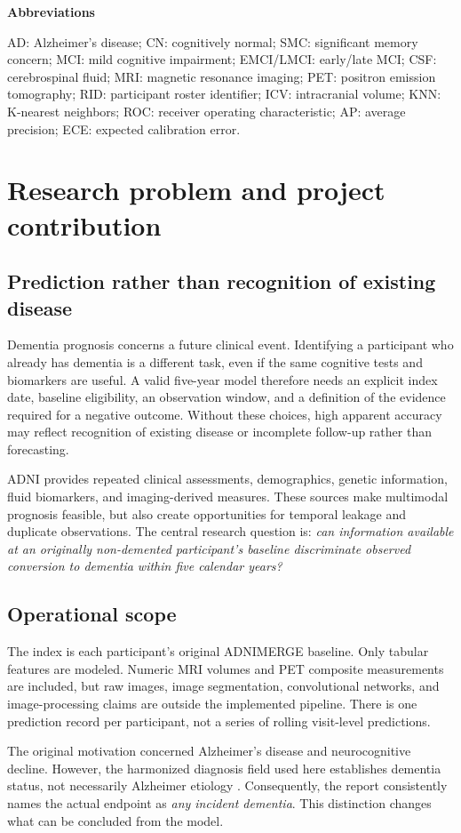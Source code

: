 \documentclass[11pt,a4paper]{article}
\begin{document}
\textbf{Abbreviations}\par
AD: Alzheimer's disease; CN: cognitively normal; SMC: significant memory concern; MCI: mild cognitive impairment; EMCI/LMCI: early/late MCI; CSF: cerebrospinal fluid; MRI: magnetic resonance imaging; PET: positron emission tomography; RID: participant roster identifier; ICV: intracranial volume; KNN: K-nearest neighbors; ROC: receiver operating characteristic; AP: average precision; ECE: expected calibration error.

\clearpage
\section{Research problem and project contribution}
\subsection{Prediction rather than recognition of existing disease}
Dementia prognosis concerns a future clinical event. Identifying a participant who already has dementia is a different task, even if the same cognitive tests and biomarkers are useful. A valid five-year model therefore needs an explicit index date, baseline eligibility, an observation window, and a definition of the evidence required for a negative outcome. Without these choices, high apparent accuracy may reflect recognition of existing disease or incomplete follow-up rather than forecasting.

ADNI provides repeated clinical assessments, demographics, genetic information, fluid biomarkers, and imaging-derived measures. These sources make multimodal prognosis feasible, but also create opportunities for temporal leakage and duplicate observations. The central research question is: \emph{can information available at an originally non-demented participant's baseline discriminate observed conversion to dementia within five calendar years?}
\subsection{Operational scope}
The index is each participant's original ADNIMERGE baseline. Only tabular features are modeled. Numeric MRI volumes and PET composite measurements are included, but raw images, image segmentation, convolutional networks, and image-processing claims are outside the implemented pipeline. There is one prediction record per participant, not a series of rolling visit-level predictions.

The original motivation concerned Alzheimer's disease and neurocognitive decline. However, the harmonized diagnosis field used here establishes dementia status, not necessarily Alzheimer etiology \cite{adni}. Consequently, the report consistently names the actual endpoint as \emph{any incident dementia}. This distinction changes what can be concluded from the model.
\end{document}
